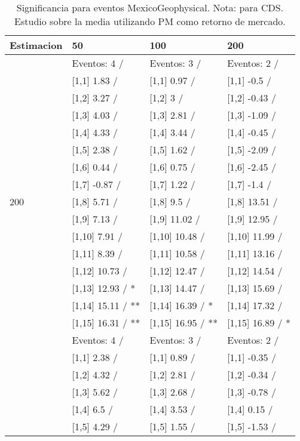 \begin{table}

\caption{Significancia para eventos MexicoGeophysical. Nota: para CDS. Estudio sobre la media utilizando PM como retorno de mercado.}
\centering
\begin{tabular}[t]{llll}
\toprule
Estimacion & 50 & 100 & 200\\
\midrule
 & Eventos:  4 / & Eventos:  3 / & Eventos:  2 /\\
 & {}[1,1] 1.83  / & {}[1,1] 0.97  / & {}[1,1] -0.5  /\\
 & {}[1,2] 3.27  / & {}[1,2] 3  / & {}[1,2] -0.43  /\\
 & {}[1,3] 4.03  / & {}[1,3] 2.81  / & {}[1,3] -1.09  /\\
 & {}[1,4] 4.33  / & {}[1,4] 3.44  / & {}[1,4] -0.45  /\\
\addlinespace
 & {}[1,5] 2.38  / & {}[1,5] 1.62  / & {}[1,5] -2.09  /\\
 & {}[1,6] 0.44  / & {}[1,6] 0.75  / & {}[1,6] -2.45  /\\
 & {}[1,7] -0.87  / & {}[1,7] 1.22  / & {}[1,7] -1.4  /\\
200 & {}[1,8] 5.71  / & {}[1,8] 9.5  / & {}[1,8] 13.51  /\\
 & {}[1,9] 7.13  / & {}[1,9] 11.02  / & {}[1,9] 12.95  /\\
\addlinespace
 & {}[1,10] 7.91  / & {}[1,10] 10.48  / & {}[1,10] 11.99  /\\
 & {}[1,11] 8.39  / & {}[1,11] 10.58  / & {}[1,11] 13.16  /\\
 & {}[1,12] 10.73  / & {}[1,12] 12.47  / & {}[1,12] 14.54  /\\
 & {}[1,13] 12.93  / * & {}[1,13] 14.47  / & {}[1,13] 15.69  /\\
 & {}[1,14] 15.11  / ** & {}[1,14] 16.39  / * & {}[1,14] 17.32  /\\
\addlinespace
 & {}[1,15] 16.31  / ** & {}[1,15] 16.95  / ** & {}[1,15] 16.89  / *\\
 & Eventos:  4 / & Eventos:  3 / & Eventos:  2 /\\
 & {}[1,1] 2.38  / & {}[1,1] 0.89  / & {}[1,1] -0.35  /\\
 & {}[1,2] 4.32  / & {}[1,2] 2.81  / & {}[1,2] -0.34  /\\
 & {}[1,3] 5.62  / & {}[1,3] 2.68  / & {}[1,3] -0.78  /\\
\addlinespace
 & {}[1,4] 6.5  / & {}[1,4] 3.53  / & {}[1,4] 0.15  /\\
 & {}[1,5] 4.29  / & {}[1,5] 1.55  / & {}[1,5] -1.53  /\\

\end{tabular}
\end{table}
